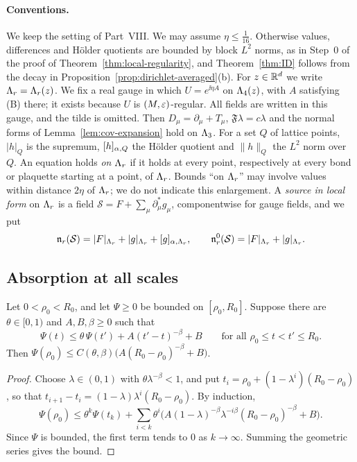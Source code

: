 \paragraph{Conventions.} We keep the setting of Part~VIII. We may assume $\eta\le\frac1{16}$. Otherwise values, differences and H\"older quotients are bounded by block $L^2$ norms, as in Step~0 of the proof of Theorem~\ref{thm:local-regularity}, and Theorem~\ref{thm:ID} follows from the decay in Proposition~\ref{prop:dirichlet-averaged}(b). For $z\in\mathbb R^d$ we write $\Lambda_r=\Lambda_r(z)$. We fix a real gauge in which $U=e^{\ii\eta A}$ on $\Lambda_4(z)$, with $A$ satisfying (B) there; it exists because $U$ is $(M,\varepsilon)$-regular. All fields are written in this gauge, and the tilde is omitted. Then $D_\mu=\partial_\mu+T_\mu$, $\mathfrak F\lambda=c\lambda$ and the normal forms of Lemma~\ref{lem:cov-expansion} hold on $\Lambda_3$. For a set $Q$ of lattice points, $|h|_Q$ is the supremum, $[h]_{\alpha,Q}$ the H\"older quotient and $\|h\|_Q$ the $L^2$ norm over $Q$. An equation holds \emph{on $\Lambda_r$} if it holds at every point, respectively at every bond or plaquette starting at a point, of $\Lambda_r$. Bounds ``on $\Lambda_r$'' may involve values within distance $2\eta$ of $\Lambda_r$; we do not indicate this enlargement. A \emph{source in local form} on $\Lambda_r$ is a field $\mathcal S=F+\sum_\mu\partial^*_\mu g_\mu$, componentwise for gauge fields, and we put
\[
\mathfrak n_r(\mathcal S)=|F|_{\Lambda_r}+|g|_{\Lambda_r}+[g]_{\alpha,\Lambda_r},\qquad\mathfrak n^0_r(\mathcal S)=|F|_{\Lambda_r}+|g|_{\Lambda_r}.
\]

\subsection{Absorption at all scales}

\begin{lemma}\label{lem:iteration}
Let $0<\rho_0<R_0$, and let $\Psi\ge0$ be bounded on $[\rho_0,R_0]$. Suppose there are $\theta\in[0,1)$ and $A,B,\beta\ge0$ such that
\[
\Psi(t)\le\theta\,\Psi(t')+A(t'-t)^{-\beta}+B\qquad\text{for all }\rho_0\le t<t'\le R_0 .
\]
Then $\Psi(\rho_0)\le C(\theta,\beta)\big(A(R_0-\rho_0)^{-\beta}+B\big)$.
\end{lemma}

\begin{proof}
Choose $\lambda\in(0,1)$ with $\theta\lambda^{-\beta}<1$, and put $t_i=\rho_0+(1-\lambda^i)(R_0-\rho_0)$, so that $t_{i+1}-t_i=(1-\lambda)\lambda^i(R_0-\rho_0)$. By induction,
\[
\Psi(\rho_0)\le\theta^k\Psi(t_k)+\sum_{i<k}\theta^i\Big(A(1-\lambda)^{-\beta}\lambda^{-i\beta}(R_0-\rho_0)^{-\beta}+B\Big).
\]
Since $\Psi$ is bounded, the first term tends to $0$ as $k\to\infty$. Summing the geometric series gives the bound.
\end{proof}

